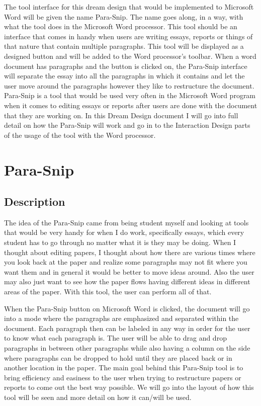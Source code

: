 \documentclass{article}
\begin{document}
{	The tool interface for this dream design that would be implemented to Microsoft Word will be given the name Para-Snip. The name goes along, in a way, with what the tool does in the Microsoft Word processor. This tool should be an interface that comes in handy when users are writing essays, reports or things of that nature that contain multiple paragraphs. This tool will be displayed as a designed button and will be added to the Word processor's toolbar. When a word document has paragraphs and the button is clicked on, the Para-Snip interface will separate the essay into all the paragraphs in which it contains and let the user move around the paragraphs however they like to restructure the document. Para-Snip is a tool that would be used very often in the Microsoft Word program when it comes to editing essays or reports after users are done with the document that they are working on. In this Dream Design document I will go into full detail on how the Para-Snip will work and go in to the Interaction Design parts of the usage of the tool with the Word processor.

\section{Para-Snip}

\subsection{Description}
	The idea of the Para-Snip came from being student myself and looking at tools that would be very handy for when I do work, specifically essays, which every student has to go through no matter what it is they may be doing. When I thought about editing papers, I thought about how there are various times where you look back at the paper and realize some paragraphs may not fit where you want them and in general it would be better to move ideas around. Also the user may also just want to see how the paper flows having different ideas in different areas of the paper. With this tool, the user can perform all of that.

	When the Para-Snip button on Microsoft Word is clicked, the document will go into a mode where the paragraphs are emphasized and separated within the document. Each paragraph then can be labeled in any way in order for the user to know what each paragraph is. The user will be able to drag and drop  paragraphs in between other paragraphs while also having a column on the side where paragraphs can be dropped to hold until they are placed back or in another location in the paper. The main goal behind this Para-Snip tool is to bring efficiency and easiness to the user when trying to restructure papers or reports to come out the best way possible. We will go into the layout of how this tool will be seen and more detail on how it can/will be used.
	
}
\end{document}
